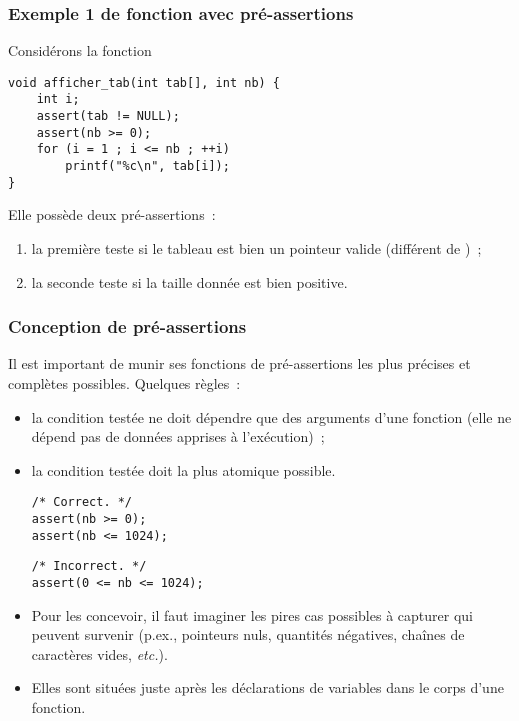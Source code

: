 \begin{frame}[fragile] 
    \frametitle{Exemple 1 de fonction avec pré-assertions}
Considérons la fonction
\begin{lstlisting}
void afficher_tab(int tab[], int nb) {
    int i;
    assert(tab != NULL);
    assert(nb >= 0);
    for (i = 1 ; i <= nb ; ++i)
        printf("%c\n", tab[i]);
}
\end{lstlisting}

Elle possède deux pré-assertions~:

\begin{enumerate}
    \item la première teste si le tableau  est bien un pointeur
    valide (différent de )~;
    \smallskip
    
    \item la seconde teste si la taille  donnée est bien 
    positive.
\end{enumerate}
\end{frame}

\begin{frame}[fragile] \frametitle{Conception de pré-assertions}
Il est important de \alert{munir ses fonctions de pré-assertions} les 
plus précises et complètes possibles. Quelques règles~:

\begin{itemize}
    \item la condition testée ne doit dépendre que des arguments d'une 
    fonction (elle ne dépend pas de données apprises à l'exécution)~;
    \smallskip
    
    \item la condition testée doit la plus atomique possible.
    \begin{multicols}{2}
        \begin{lstlisting}
/* Correct. */
assert(nb >= 0);
assert(nb <= 1024);
        \end{lstlisting}
  
        \begin{lstlisting}
/* Incorrect. */
assert(0 <= nb <= 1024);
        \end{lstlisting}
    \end{multicols}
    \smallskip
    
    \item Pour les concevoir, il faut imaginer les pires cas possibles
    à capturer qui peuvent survenir (p.ex., pointeurs nuls, quantités
    négatives, chaînes de caractères vides, {\em etc.}).
    \smallskip
    
    \item Elles sont situées juste après les déclarations de variables
    dans le corps d'une fonction.
\end{itemize}
\end{frame}

